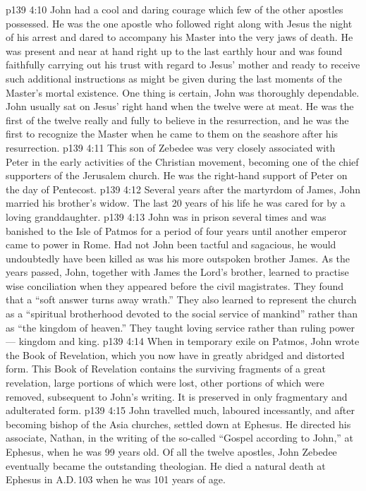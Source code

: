 \vs p139 4:10 John had a cool and daring courage which few of the other apostles possessed. He was the one apostle who followed right along with Jesus the night of his arrest and dared to accompany his Master into the very jaws of death. He was present and near at hand right up to the last earthly hour and was found faithfully carrying out his trust with regard to Jesus’ mother and ready to receive such additional instructions as might be given during the last moments of the Master’s mortal existence. One thing is certain, John was thoroughly dependable. John usually sat on Jesus’ right hand when the twelve were at meat. He was the first of the twelve really and fully to believe in the resurrection, and he was the first to recognize the Master when he came to them on the seashore after his resurrection.
\vs p139 4:11 This son of Zebedee was very closely associated with Peter in the early activities of the Christian movement, becoming one of the chief supporters of the Jerusalem church. He was the right\hyp{}hand support of Peter on the day of Pentecost.
\vs p139 4:12 Several years after the martyrdom of James, John married his brother’s widow. The last 20 years of his life he was cared for by a loving granddaughter.
\vs p139 4:13 John was in prison several times and was banished to the Isle of Patmos for a period of four years until another emperor came to power in Rome. Had not John been tactful and sagacious, he would undoubtedly have been killed as was his more outspoken brother James. As the years passed, John, together with James the Lord’s brother, learned to practise wise conciliation when they appeared before the civil magistrates. They found that a “soft answer turns away wrath.” They also learned to represent the church as a “spiritual brotherhood devoted to the social service of mankind” rather than as “the kingdom of heaven.” They taught loving service rather than ruling power --- kingdom and king.
\vs p139 4:14 When in temporary exile on Patmos, John wrote the Book of Revelation, which you now have in greatly abridged and distorted form. This Book of Revelation contains the surviving fragments of a great revelation, large portions of which were lost, other portions of which were removed, subsequent to John’s writing. It is preserved in only fragmentary and adulterated form.
\vs p139 4:15 John travelled much, laboured incessantly, and after becoming bishop of the Asia churches, settled down at Ephesus. He directed his associate, Nathan, in the writing of the so\hyp{}called “Gospel according to John,” at Ephesus, when he was 99 years old. Of all the twelve apostles, John Zebedee eventually became the outstanding theologian. He died a natural death at Ephesus in A.D.\,103 when he was 101 years of age.
